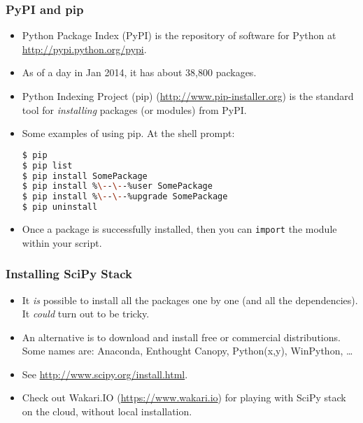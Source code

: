 \documentclass{beamer}
\begin{document}
\begin{frame}[fragile]
\frametitle{PyPI and pip}
\begin{itemize}
\item Python Package Index (PyPI) is the repository 
      of software for Python at
      \url{http://pypi.python.org/pypi}.
\item As of a day in Jan 2014, it has about 38,800 packages.
\item Python Indexing Project (pip) (\url{http://www.pip-installer.org}) 
      is the standard tool for \emph{installing} packages
      (or modules) from PyPI. 
\item Some examples of using pip. At the shell prompt:
\begin{lstlisting}[language=bash,escapechar=\%]
$ pip
$ pip list
$ pip install SomePackage
$ pip install %\--\--%user SomePackage
$ pip install %\--\--%upgrade SomePackage
$ pip uninstall
\end{lstlisting}
\item Once a package is successfully installed,
      then you can \lstinline{import} the module
      within your script.
\end{itemize}
\end{frame}

\begin{frame}[fragile]
\frametitle{Installing SciPy Stack}
\begin{itemize}
\item It \emph{is} possible to install all the packages
      one by one (and all the dependencies). It \emph{could}
      turn out to be tricky.
\item An alternative is to download and install free 
      or commercial distributions. Some names are:
      Anaconda, Enthought Canopy, Python(x,y), WinPython,
      \ldots
\item See \url{http://www.scipy.org/install.html}.
\item Check out Wakari.IO (\url{https://www.wakari.io})
      for playing with SciPy stack on the cloud, without
      local installation.
\end{itemize}
\end{frame}
\end{document}
